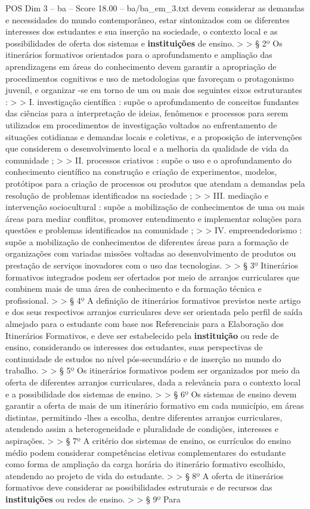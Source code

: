 \begin{textsample}{POS Dim 3 – ba – Score 18.00 – ba/ba\_em\_3.txt}
devem considerar as demandas e necessidades do mundo contemporâneo, estar sintonizados com os diferentes interesses dos estudantes e sua inserção na sociedade, o contexto local e as possibilidades de oferta dos sistemas e \textbf{instituições} de ensino. > > § 2º Os itinerários formativos orientados para o aprofundamento e ampliação das aprendizagens em áreas do conhecimento devem garantir a apropriação de procedimentos cognitivos e uso de metodologias que favoreçam o protagonismo juvenil, e organizar -se em torno de um ou mais dos seguintes eixos estruturantes : > > I. investigação científica : supõe o aprofundamento de conceitos fundantes das ciências para a interpretação de ideias, fenômenos e processos para serem utilizados em procedimentos de investigação voltados ao enfrentamento de situações cotidianas e demandas locais e coletivas, e a proposição de intervenções que considerem o desenvolvimento local e a melhoria da qualidade de vida da comunidade ; > > II. processos criativos : supõe o uso e o aprofundamento do conhecimento científico na construção e criação de experimentos, modelos, protótipos para a criação de processos ou produtos que atendam a demandas pela resolução de problemas identificados na sociedade ; > > III. mediação e intervenção sociocultural : supõe a mobilização de conhecimentos de uma ou mais áreas para mediar conflitos, promover entendimento e implementar soluções para questões e problemas identificados na comunidade ; > > IV. empreendedorismo : supõe a mobilização de conhecimentos de diferentes áreas para a formação de organizações com variadas missões voltadas ao desenvolvimento de produtos ou prestação de serviços inovadores com o uso das tecnologias. > > § 3º Itinerários formativos integrados podem ser ofertados por meio de arranjos curriculares que combinem mais de uma área de conhecimento e da formação técnica e profissional. > > § 4º A definição de itinerários formativos previstos neste artigo e dos seus respectivos arranjos curriculares deve ser orientada pelo perfil de saída almejado para o estudante com base nos Referenciais para a Elaboração dos Itinerários Formativos, e deve ser estabelecido pela \textbf{instituição} ou rede de ensino, considerando os interesses dos estudantes, suas perspectivas de continuidade de estudos no nível pós-secundário e de inserção no mundo do trabalho. > > § 5º Os itinerários formativos podem ser organizados por meio da oferta de diferentes arranjos curriculares, dada a relevância para o contexto local e a possibilidade dos sistemas de ensino. > > § 6º Os sistemas de ensino devem garantir a oferta de mais de um itinerário formativo em cada município, em áreas distintas, permitindo -lhes a escolha, dentre diferentes arranjos curriculares, atendendo assim a heterogeneidade e pluralidade de condições, interesses e aspirações. > > § 7º A critério dos sistemas de ensino, os currículos do ensino médio podem considerar competências eletivas complementares do estudante como forma de ampliação da carga horária do itinerário formativo escolhido, atendendo ao projeto de vida do estudante. > > § 8º A oferta de itinerários formativos deve considerar as possibilidades estruturais e de recursos das \textbf{instituições} ou redes de ensino. > > § 9º Para 
\end{textsample}
